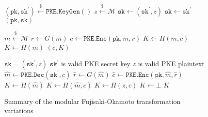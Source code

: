 \documentclass[journal=tches,submission]{iacrtrans}
\newcommand{\pke}{\texttt{PKE}}
\newcommand{\keygen}{\texttt{KeyGen}}
\newcommand{\encrypt}{\texttt{Enc}}
\newcommand{\decrypt}{\texttt{Dec}}
\newcommand{\kem}{\texttt{KEM}}
\newcommand{\encap}{\texttt{Encap}}
\newcommand{\decap}{\texttt{Decap}}
\newcommand{\pk}{\texttt{pk}}
\newcommand{\sk}{\texttt{sk}}
\newcommand{\leftsample}{\stackrel{\$}{\leftarrow}}
\begin{document}
\begin{figure}[H]
    \centering
    \begin{minipage}[t]{0.49\textwidth}
        \begin{algorithm}[H]
            \caption*{$\kem\texttt{.}\keygen()$}
            \begin{algorithmic}[1]
                \State $(\pk, \sk^\prime) \leftsample \pke\texttt{.}\keygen()$
                \State $z \leftsample \mathcal{M}$
                \State $\sk \leftarrow (\sk^\prime, z)$
                \State $\sk \leftarrow \sk^\prime$
                \State \Return $(\pk, \sk)$
            \end{algorithmic}
        \end{algorithm}
        \begin{algorithm}[H]
            \caption*{$\kem\texttt{.}\encap(\pk)$}
            \begin{algorithmic}[1]
                \State $m \leftsample \mathcal{M}$
                \State $r \leftarrow G(m)$
                \State $c \leftarrow \pke\texttt{.}\encrypt(\pk, m, r)$
                \State $K \leftarrow H(m, c)$
                \State $K \leftarrow H(m)$
                \State \Return $(c, K)$
            \end{algorithmic}
        \end{algorithm}
    \end{minipage}
    \begin{minipage}[t]{0.5\textwidth}
        \begin{algorithm}[H]
            \caption*{$\kem\texttt{.}\decap(\sk, c)$}
            \begin{algorithmic}[1]
                \Ensure $\sk = (\sk^\prime, z)$
                \Ensure $\sk^\prime$ is valid PKE secret key
                \Ensure $z$ is valid PKE plaintext
                \State $\hat{m} \leftarrow \pke\texttt{.}\decrypt(\sk^\prime, c)$
                \State $\hat{r} \leftarrow G(\hat{m})$
                \State $\hat{c} \leftarrow \pke\texttt{.}\encrypt(\pk, \hat{m}, \hat{r})$
                    \State $K \leftarrow H(\hat{m})$
                    \State $K \leftarrow H(\hat{m}, c)$
                \Else
                    \State $K \leftarrow H(z, c)$
                    \State $K \leftarrow \bot$
                \EndIf 
                \State \Return $K$
            \end{algorithmic}
        \end{algorithm}
    \end{minipage}
    \caption{Summary of the modular Fujisaki-Okamoto transformation variations}\label{fig:fo-routines}
\end{figure}
\end{document}
